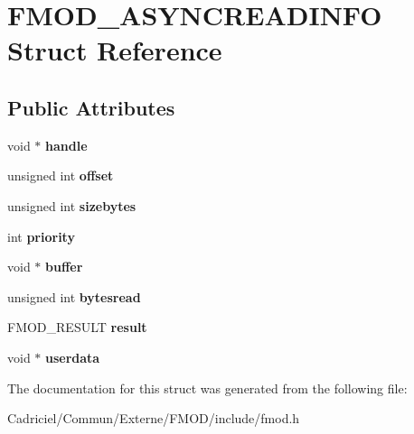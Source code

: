\hypertarget{struct_f_m_o_d___a_s_y_n_c_r_e_a_d_i_n_f_o}{\section{F\-M\-O\-D\-\_\-\-A\-S\-Y\-N\-C\-R\-E\-A\-D\-I\-N\-F\-O Struct Reference}
\label{struct_f_m_o_d___a_s_y_n_c_r_e_a_d_i_n_f_o}
}
\subsection*{Public Attributes}
\begin{DoxyCompactItemize}
\item 
\hypertarget{struct_f_m_o_d___a_s_y_n_c_r_e_a_d_i_n_f_o_a31e2e01864e3c97844a252f947ff8040}{void $\ast$ {\bfseries handle}}\label{struct_f_m_o_d___a_s_y_n_c_r_e_a_d_i_n_f_o_a31e2e01864e3c97844a252f947ff8040}

\item 
\hypertarget{struct_f_m_o_d___a_s_y_n_c_r_e_a_d_i_n_f_o_a8d42cc77cd8ef0559a666038e02a8807}{unsigned int {\bfseries offset}}\label{struct_f_m_o_d___a_s_y_n_c_r_e_a_d_i_n_f_o_a8d42cc77cd8ef0559a666038e02a8807}

\item 
\hypertarget{struct_f_m_o_d___a_s_y_n_c_r_e_a_d_i_n_f_o_a19cda62a563d8b9c3116411c13d207f6}{unsigned int {\bfseries sizebytes}}\label{struct_f_m_o_d___a_s_y_n_c_r_e_a_d_i_n_f_o_a19cda62a563d8b9c3116411c13d207f6}

\item 
\hypertarget{struct_f_m_o_d___a_s_y_n_c_r_e_a_d_i_n_f_o_aae5a4b76307bec7a0132b3abb04ab823}{int {\bfseries priority}}\label{struct_f_m_o_d___a_s_y_n_c_r_e_a_d_i_n_f_o_aae5a4b76307bec7a0132b3abb04ab823}

\item 
\hypertarget{struct_f_m_o_d___a_s_y_n_c_r_e_a_d_i_n_f_o_a2154c0c4825d5f133e0b14ca1b94b324}{void $\ast$ {\bfseries buffer}}\label{struct_f_m_o_d___a_s_y_n_c_r_e_a_d_i_n_f_o_a2154c0c4825d5f133e0b14ca1b94b324}

\item 
\hypertarget{struct_f_m_o_d___a_s_y_n_c_r_e_a_d_i_n_f_o_acef1543320ee49d5c723ce1dbd58e43b}{unsigned int {\bfseries bytesread}}\label{struct_f_m_o_d___a_s_y_n_c_r_e_a_d_i_n_f_o_acef1543320ee49d5c723ce1dbd58e43b}

\item 
\hypertarget{struct_f_m_o_d___a_s_y_n_c_r_e_a_d_i_n_f_o_a85e0137ab5748fbbd7ffee359823f57e}{F\-M\-O\-D\-\_\-\-R\-E\-S\-U\-L\-T {\bfseries result}}\label{struct_f_m_o_d___a_s_y_n_c_r_e_a_d_i_n_f_o_a85e0137ab5748fbbd7ffee359823f57e}

\item 
\hypertarget{struct_f_m_o_d___a_s_y_n_c_r_e_a_d_i_n_f_o_a8a273751e70e26c1a51540a18269eecc}{void $\ast$ {\bfseries userdata}}\label{struct_f_m_o_d___a_s_y_n_c_r_e_a_d_i_n_f_o_a8a273751e70e26c1a51540a18269eecc}

\end{DoxyCompactItemize}


The documentation for this struct was generated from the following file\-:\begin{DoxyCompactItemize}
\item 
Cadriciel/\-Commun/\-Externe/\-F\-M\-O\-D/include/fmod.\-h\end{DoxyCompactItemize}
